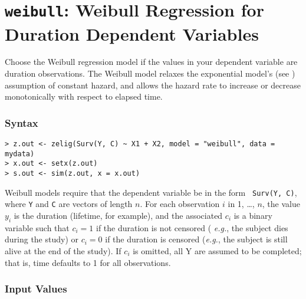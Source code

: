 

\usepackage{Sweave}

\nobibliography*


\section{{\tt weibull}: Weibull Regression for Duration
Dependent Variables}\label{weibull}

Choose the Weibull regression model if the values in your dependent
variable are duration observations.  The Weibull model relaxes the
exponential model's (see ) assumption of constant hazard,
and allows the hazard rate to increase or decrease monotonically with
respect to elapsed time.

\subsubsection{Syntax}

\begin{verbatim}
> z.out <- zelig(Surv(Y, C) ~ X1 + X2, model = "weibull", data = mydata)
> x.out <- setx(z.out)
> s.out <- sim(z.out, x = x.out)
\end{verbatim}
Weibull models require that the dependent variable be in the form {\tt
  Surv(Y, C)}, where {\tt Y} and {\tt C} are vectors of length $n$.
For each observation $i$ in 1, \dots, $n$, the value $y_i$ is the
duration (lifetime, for example), and the associated $c_i$ is a binary
variable such that $c_i = 1$ if the duration is not censored ({\it
  e.g.}, the subject dies during the study) or $c_i = 0$ if the
duration is censored ({\it e.g.}, the subject is still alive at the
end of the study).  If $c_i$ is omitted, all Y are assumed to be
completed; that is, time defaults to 1 for all observations.

\subsubsection{Input Values} 

